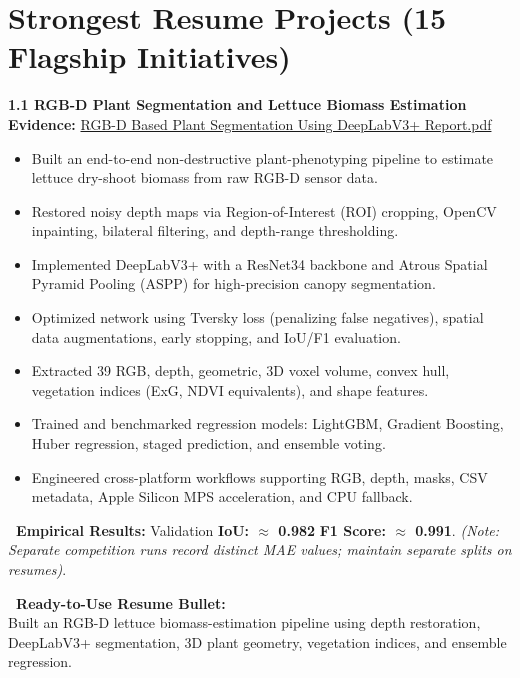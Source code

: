 \documentclass[10pt,a4paper]{article}
\newcommand{\statuscompleted}{\tcbox[on line, colback=completedbg, colframe=completed!50!white, size=small, arc=2pt, boxrule=0.5pt]{\scriptsize\bfseries\color{completed}\faIcon{check-circle}\ COMPLETED / SUBSTANTIAL}}
\begin{document}
\newpage

\section{Strongest Resume Projects (15 Flagship Initiatives)}

\begin{projectcard}
  \textbf{\large 1.1 RGB-D Plant Segmentation and Lettuce Biomass Estimation} \hfill \statuscompleted\\[2pt]
  {\footnotesize\color{textmuted}\textbf{Evidence:} \underline{RGB-D Based Plant Segmentation Using DeepLabV3+ Report.pdf}}
  \begin{itemize}[leftmargin=14pt, itemsep=1.5pt, topsep=2pt]
    \item Built an end-to-end non-destructive plant-phenotyping pipeline to estimate lettuce dry-shoot biomass from raw RGB-D sensor data.
    \item Restored noisy depth maps via Region-of-Interest (ROI) cropping, OpenCV inpainting, bilateral filtering, and depth-range thresholding.
    \item Implemented DeepLabV3+ with a ResNet34 backbone and Atrous Spatial Pyramid Pooling (ASPP) for high-precision canopy segmentation.
    \item Optimized network using Tversky loss (penalizing false negatives), spatial data augmentations, early stopping, and IoU/F1 evaluation.
    \item Extracted 39 RGB, depth, geometric, 3D voxel volume, convex hull, vegetation indices (ExG, NDVI equivalents), and shape features.
    \item Trained and benchmarked regression models: LightGBM, Gradient Boosting, Huber regression, staged prediction, and ensemble voting.
    \item Engineered cross-platform workflows supporting RGB, depth, masks, CSV metadata, Apple Silicon MPS acceleration, and CPU fallback.
  \end{itemize}
  \begin{metricsbox}
    \textbf{\ Empirical Results:} Validation \textbf{IoU: $\approx$ 0.982} \quad\textbar\quad \textbf{F1 Score: $\approx$ 0.991}. \emph{(Note: Separate competition runs record distinct MAE values; maintain separate splits on resumes)}.
  \end{metricsbox}
  \begin{resumebox}
    \textbf{\color{accent}\ Ready-to-Use Resume Bullet:}\\
    Built an RGB-D lettuce biomass-estimation pipeline using depth restoration, DeepLabV3+ segmentation, 3D plant geometry, vegetation indices, and ensemble regression.
  \end{resumebox}
\end{projectcard}
\end{document}
